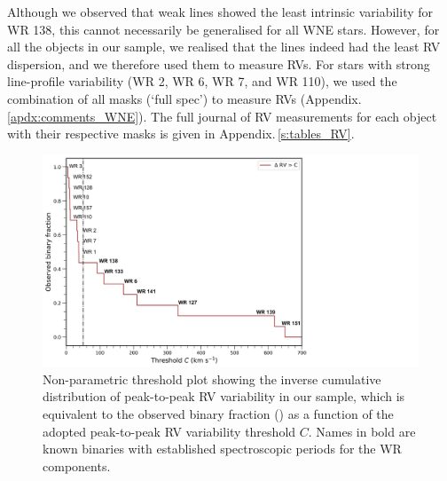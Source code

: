 Although we observed that weak \nv{} lines showed the least intrinsic variability for WR 138, this  cannot necessarily be generalised for all WNE stars. However, for all the objects in our sample, we realised that the \nv{} lines indeed had the least RV dispersion, and we therefore used them to measure RVs. For stars with strong line-profile variability (WR 2, WR 6, WR 7, and WR 110), we used the combination of all masks (`full spec') to measure RVs (Appendix.\,\ref{apdx:comments_WNE}). The full journal of RV measurements for each object with their respective masks is given in Appendix.\,\ref{s:tables_RV}.

\begin{figure}[t]
    \centering
    \includegraphics[width=\textwidth]{chapters/WNE/image/BINFRAC_WN_NOGRID.pdf}
    \caption{Non-parametric threshold plot showing the inverse cumulative distribution of peak-to-peak RV variability in our sample, which is equivalent to the observed binary fraction (\fobsWNE{}) as a function of the adopted peak-to-peak RV variability threshold $C$. Names in bold are known binaries with established spectroscopic periods for the WR components.}
    \label{fig:binfrac}
\end{figure}
